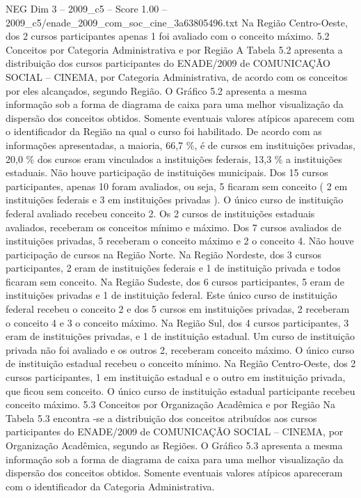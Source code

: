 \begin{textsample}{NEG Dim 3 – 2009\_c5 – Score 1.00 – 2009\_c5/enade\_2009\_com\_soc\_cine\_3a63805496.txt}
Na Região Centro-Oeste, dos 2 cursos participantes apenas 1 foi avaliado com o conceito máximo. 5.2 Conceitos por Categoria Administrativa e por Região A Tabela 5.2 apresenta a distribuição dos cursos participantes do ENADE/2009 de COMUNICAÇÃO SOCIAL – CINEMA, por Categoria Administrativa, de acordo com os conceitos por eles alcançados, segundo Região.
O Gráfico 5.2 apresenta a mesma informação sob a forma de diagrama de caixa para uma melhor visualização da dispersão dos conceitos obtidos.
Somente eventuais valores atípicos aparecem com o identificador da Região na qual o curso foi habilitado.
De acordo com as informações apresentadas, a maioria, 66,7 \%, é de cursos em instituições privadas, 20,0 \% dos cursos eram vinculados a instituições federais, 13,3 \% a instituições estaduais.
Não houve participação de instituições municipais.
Dos 15 cursos participantes, apenas 10 foram avaliados, ou seja, 5 ficaram sem conceito ( 2 em instituições federais e 3 em instituições privadas ).
O único curso de instituição federal avaliado recebeu conceito 2.
Os 2 cursos de instituições estaduais avaliados, receberam os conceitos mínimo e máximo.
Dos 7 cursos avaliados de instituições privadas, 5 receberam o conceito máximo e 2 o conceito 4.
Não houve participação de cursos na Região Norte.
Na Região Nordeste, dos 3 cursos participantes, 2 eram de instituições federais e 1 de instituição privada e todos ficaram sem conceito.
Na Região Sudeste, dos 6 cursos participantes, 5 eram de instituições privadas e 1 de instituição federal.
Este único curso de instituição federal recebeu o conceito 2 e dos 5 cursos em instituições privadas, 2 receberam o conceito 4 e 3 o conceito máximo.
Na Região Sul, dos 4 cursos participantes, 3 eram de instituições privadas, e 1 de instituição estadual.
Um curso de instituição privada não foi avaliado e os outros 2, receberam conceito máximo.
O único curso de instituição estadual recebeu o conceito mínimo.
Na Região Centro-Oeste, dos 2 cursos participantes, 1 em instituição estadual e o outro em instituição privada, que ficou sem conceito.
O único curso de instituição estadual participante recebeu conceito máximo. 5.3 Conceitos por Organização Acadêmica e por Região Na Tabela 5.3 encontra -se a distribuição dos conceitos atribuídos aos cursos participantes do ENADE/2009 de COMUNICAÇÃO SOCIAL – CINEMA, por Organização Acadêmica, segundo as Regiões.
O Gráfico 5.3 apresenta a mesma informação sob a forma de diagrama de caixa para uma melhor visualização da dispersão dos conceitos obtidos.
Somente eventuais valores atípicos apareceram com o identificador da Categoria Administrativa.

\end{textsample}
